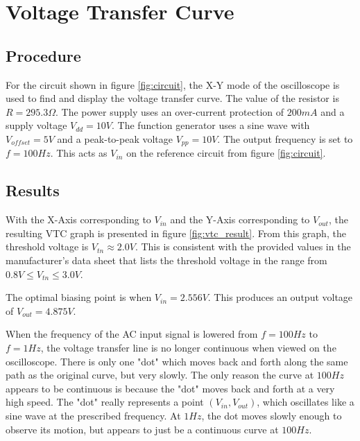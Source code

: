 
\section{Voltage Transfer Curve}

\subsection{Procedure}

For the circuit shown in figure \ref{fig:circuit}, the X-Y mode of the oscilloscope is used to find and display the voltage transfer curve. The value of the resistor is $R=295.3 \Omega$. The power supply uses an over-current protection of $200mA$ and a supply voltage $V_{dd} = 10V$. The function generator uses a sine wave with $V_{offset} = 5V$ and a peak-to-peak voltage $V_{pp} = 10V$. The output frequency is set to $f = 100 Hz$. This acts as $V_{in}$ on the reference circuit from figure \ref{fig:circuit}.

\FloatBarrier

\subsection{Results}
With the X-Axis corresponding to $V_{in}$ and the Y-Axis corresponding to $V_{out}$, the resulting VTC graph is presented in figure \ref{fig:vtc_result}. From this graph, the threshold voltage is $V_{tn}\approx 2.0V$. This is consistent with the provided values in the manufacturer's data sheet that lists the threshold voltage in the range from $0.8 V \le V_{tn} \le 3.0 V$.

The optimal biasing point is when $V_{in} = 2.556 V$. This produces an output voltage of $V_{out} = 4.875 V$.

When the frequency of the AC input signal is lowered from $f=100Hz$ to $f=1 Hz$, the voltage transfer line is no longer continuous when viewed on the oscilloscope. There is only one "dot" which moves back and forth along the same path as the original curve, but very slowly. The only reason the curve at $100 Hz$ appears to be continuous is because the "dot" moves back and forth at a very high speed. The "dot" really represents a point $(V_{in},V_{out})$, which oscillates like a sine wave at the prescribed frequency. At $1 Hz$, the dot moves slowly enough to observe its motion, but appears to just be a continuous curve at $100 Hz$.


